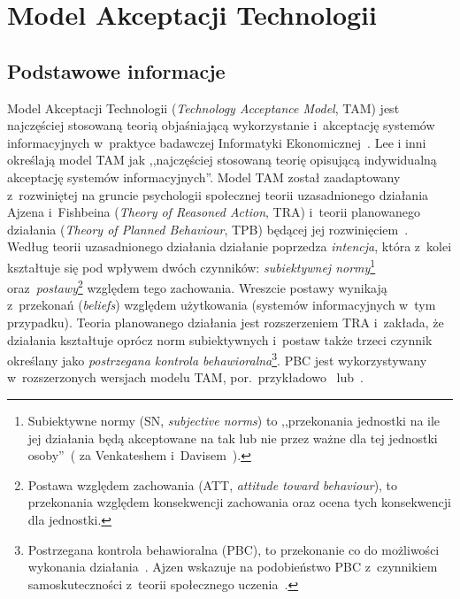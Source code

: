 \documentclass[brudnopis,xodstep]{wkmgr}
\begin{document}
\chapter{Model Akceptacji Technologii \label{TAM-def-punkt}}
\section{Podstawowe informacje \label{TAM-def}}

Model Akceptacji Technologii (\emph{Technology Acceptance Model}, TAM)
jest najczęściej stosowaną teorią objaśniającą wykorzystanie
i~akceptację systemów informacyjnych w~praktyce badawczej Informatyki
Ekonomicznej~\citep{VenkateshEtAl03,VenkateshDavis00}.
Lee i inni~\citeyearpar{LeeKozarLarsen2003} określają model TAM jak
,,najczęściej stosowaną teorię opisującą 
indywidualną akceptację systemów informacyjnych''.
Model TAM został zaadaptowany z~rozwiniętej na gruncie psychologii
społecznej teorii uzasadnionego działania 
Ajzena i~Fishbeina (\emph{Theory of Reasoned Action},
TRA) i~teorii planowanego 
działania (\emph{Theory of Planned Behaviour}, TPB) 
będącej jej
rozwinięciem~\citep{FishbeinAjzen1975,Ajzen1991}.
Według teorii uzasadnionego działania
działanie poprzedza \emph{intencja}, która z~kolei
kształtuje się pod wpływem dwóch czynników: \emph{subiektywnej
  normy\/}\footnote{Subiektywne normy
  (SN, \emph{subjective norms\/}) to ,,przekonania jednostki na ile jej
  działania będą akceptowane na tak lub nie przez ważne dla tej
  jednostki osoby''~(\citet[s.~302]{Ajzen1991} za Venkateshem i~Davisem~\citeyearpar[s.~187]{VenkateshDavis00}).}
oraz~\emph{postawy\/}\footnote{Postawa względem zachowania
  (ATT, \emph{attitude toward behaviour\/}), to przekonania względem
  konsekwencji zachowania oraz ocena tych konsekwencji dla jednostki.}
względem tego zachowania.  Wreszcie postawy wynikają z~przekonań
(\emph{beliefs\/}) względem użytkowania (systemów informacyjnych w~tym
przypadku). 
Teoria planowanego działania
jest rozszerzeniem TRA i~zakłada, że działania kształtuje
oprócz norm subiektywnych i~postaw także trzeci 
czynnik określany jako \emph{postrzegana kontrola 
behawioralna\/}\footnote{Postrzegana kontrola 
behawioralna\label{TPB-def} (PBC), to
przekonanie co do możliwości wykonania działania~\citep{Ajzen-tpb-www}.
Ajzen \citeyearpar[s.~18]{Ajzen1991}
wskazuje na podobieństwo PBC z~czynnikiem samoskuteczności
z~teorii społecznego uczenia~\citep{Bandura1994}. }.
PBC jest wykorzystywany w~rozszerzonych wersjach modelu TAM, 
por.~przykładowo~\cite{VenkateshEtAl03} lub~\cite{MathiesonEtAl01}.
\end{document}
